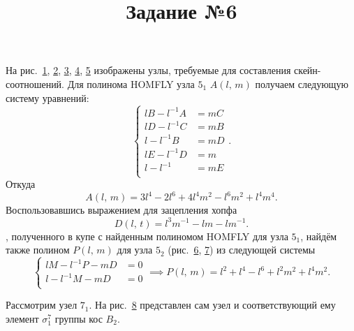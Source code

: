 \documentclass[a4paper]{article}
\title{Задание №6}
\begin{document}
	\maketitle
{}
На рис.~\ref{fig:1}, \ref{fig:2}, \ref{fig:3}, \ref{fig:4}, \ref{fig:5} изображены узлы, требуемые для составления скейн-соотношений.
Для полинома HOMFLY узла $5_1$ $A(l,\,m)$ получаем следующую систему уравнений:
\[
\left\{
\begin{aligned}
	lB-l^{-1}A&=mC  \\
	lD-l^{-1}C&=mB \\
	l-l^{-1}B&=mD  \\
lE-l^{-1}D&=m  \\
l-l^{-1}&=mE  \\
\end{aligned}
\right.
.\] 
Откуда
\[
	A(l,\,m)=3l^4-2l^6+4l^4m^2-l^6m^2+l^4m^4
.\] 
Воспользовавшись выражением для зацепления хопфа
\[
	D(l,\,t)=l^3m^{-1}-lm-lm^{-1}
.\] , полученного
в купе с найденным полиномом HOMFLY для узла $5_1$, найдём
также полином $P(l,\,m)$ для узла $5_2$ (рис.~\ref{fig:6}, \ref{fig:7}) из следующей системы
\[
\left\{
\begin{aligned}
lM-l^{-1}P-mD&= 0 \\
l-l^{-1}M-mD&= 0 \\
\end{aligned}
\right. \implies P(l,\,m)=l^2+l^4-l^6+l^2m^2+l^4m^2
.\] 
\begin{figure}[ht]
    \centering
    \caption{}
    \label{fig:1}
\end{figure}
\begin{figure}[ht]
    \centering
    \caption{}
    \label{fig:2}
\end{figure}
\begin{figure}[ht]
    \centering
    \caption{}
    \label{fig:3}
\end{figure}
\begin{figure}[ht]
    \centering
    \caption{}
    \label{fig:4}
\end{figure}
\begin{figure}[ht]
    \centering
    \caption{}
    \label{fig:5}
\end{figure}
\begin{figure}[ht]
    \centering
    \caption{}
    \label{fig:6}
\end{figure}
\begin{figure}[ht]
    \centering
    \caption{}
    \label{fig:7}
\end{figure}
Рассмотрим узел $7_1$. На рис.~\ref{fig:8} представлен сам узел и соответствующий
ему элемент $\sigma_1^7$ группы кос $B_2$.
\begin{figure}[ht]
    \centering
    \caption{}
    \label{fig:8}
\end{figure}
\end{document}
